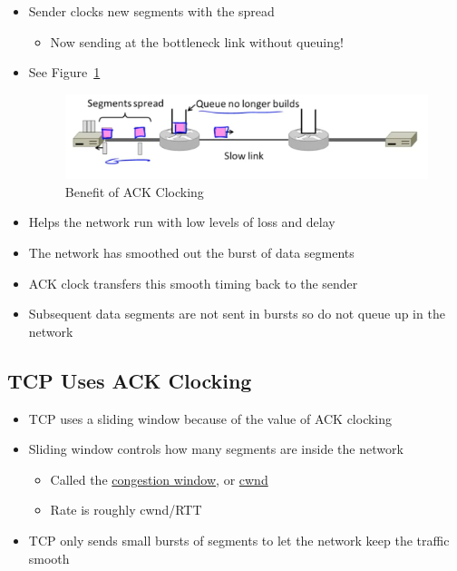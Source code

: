 \documentclass[12pt]{ctexart}   %
\begin{document}
\begin{itemize}
		 \item Sender clocks new segments with the spread
		 \begin{itemize}
		 	\item Now sending at the bottleneck link without queuing!
		 \end{itemize}
		  \item See Figure~\ref{fig:7-5-6}
		  
		 \begin{figure}[h!] %
		\centering
		 \includegraphics[scale=0.7]{images/7-5-6}
		\caption{ Benefit of ACK Clocking}
		 \label{fig:7-5-6}
		 \end{figure}		 
		 
		 \item Helps the network run with low levels of loss and delay
		 \item The network has smoothed out the burst of data segments
		 \item ACK clock transfers this smooth timing back to the sender
		 \item Subsequent data segments are not sent in bursts so do not queue up in the network
	\end{itemize}
	
	\subsection{TCP Uses ACK Clocking}
	\begin{itemize}
		\item TCP uses a sliding window because of the value of ACK clocking
		
		\item Sliding window controls how many segments are inside the network
		\begin{itemize}
			\item Called the \underline{congestion window}, or \underline{cwnd}
			\item Rate is roughly cwnd/RTT 
		\end{itemize}
		
		\item TCP only sends small bursts of segments to let the network keep the traffic smooth
	\end{itemize}
	
\end{document}
